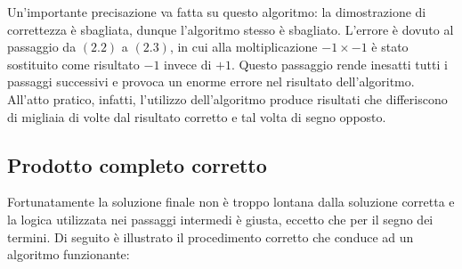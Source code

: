 \documentclass[Lau]{sapthesis}
\begin{document}
Un'importante precisazione va fatta su questo algoritmo: la dimostrazione di correttezza è sbagliata, dunque l'algoritmo stesso è sbagliato. L'errore è dovuto al passaggio da $(2.2)$ a $(2.3)$, in cui alla moltiplicazione $-1 \times -1$ è stato sostituito come risultato $-1$ invece di $+1$. Questo passaggio rende inesatti tutti i passaggi successivi e provoca un enorme errore nel risultato dell'algoritmo. All'atto pratico, infatti, l'utilizzo dell'algoritmo produce risultati che differiscono di migliaia di volte dal risultato corretto e tal volta di segno opposto.


\subsection{Prodotto completo corretto}
Fortunatamente la soluzione finale non è troppo lontana dalla soluzione corretta e la logica utilizzata nei passaggi intermedi è giusta, eccetto che per il segno dei termini. Di seguito è illustrato il procedimento corretto che conduce ad un algoritmo funzionante:
\end{document}
